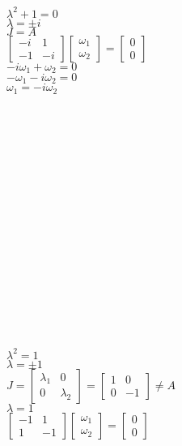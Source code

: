 \begin{multicols}{2}\noindent
$\lambda^2+1=0$\\
$\lambda = \pm i$\\
$J=A$\\
$\left[\begin{array}{cc}-i&1\\-1&-i\end{array}\right]\left[\begin{array}{c}\omega_1\\ \omega_2\end{array}\right]=\left[\begin{array}{c}0\\0\end{array}\right]$\\
$-i\omega_1+\omega_2 =0$\\
$-\omega_1-i\omega_2=0$\\
$\omega_1=-i\omega_2$
\\\\\\\\\\\\\\\\\\\\\\\\\\\\\\\\\\
$\lambda^2=1$\\
$\lambda = \pm 1$\\
$J=\left[\begin{array}{cc}\lambda_1&0\\0&\lambda_2\end{array}\right]=\left[\begin{array}{cc}1&0\\0&-1\end{array}\right] \neq A$\\
$\boxed{\lambda=1}$\\
$\left[\begin{array}{cc}-1&1\\1&-1\end{array}\right]\left[\begin{array}{c}\omega_1\\ \omega_2\end{array}\right]=\left[\begin{array}{c}0\\0\end{array}\right]$\\

\end{multicols}
